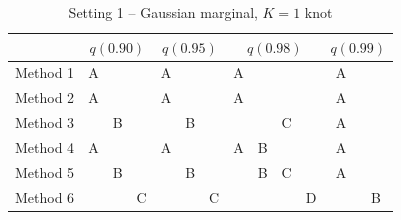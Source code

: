 \documentclass[useAMS,usenatbib,referee]{biomweb}
\begin{document}
\begin{table}[htbp]
  \centering
  \caption{Setting 1 -- Gaussian marginal, $K = 1$ knot}
  \label{sttbl:gaussim}
  \begin{tabular}{|l|ccc|ccc|cccc|cc|}
    \cline{2-13}
    \multicolumn{1}{c}{} & \multicolumn{3}{|c}{$q(0.90)$} & \multicolumn{3}{|c}{$q(0.95)$} & \multicolumn{4}{|c}{$q(0.98)$} & \multicolumn{2}{|c|}{$q(0.99)$} \\
    \hline
    Method 1 & A &   &   & A &   &   & A &   &   &   & A &   \\
    \hline
    Method 2 & A &   &   & A &   &   & A &   &   &   & A &   \\
    \hline
    Method 3 &   & B &   &   & B &   &   &   & C &   & A &   \\
    \hline
    Method 4 & A &   &   & A &   &   & A & B &   &   & A &   \\
    \hline
    Method 5 &   & B &   &   & B &   &   & B & C &   & A &   \\
    \hline
    Method 6 &   &   & C &   &   & C &   &   &   & D &   & B \\
    \hline
  \end{tabular}
\end{table}

\end{document}
